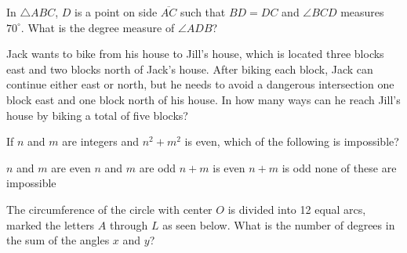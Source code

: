 \documentclass[12pt]{exam}
\begin{document}
\begin{questions}
\question 
In $\bigtriangleup ABC$, $D$ is a point on side $\overline{AC}$ such that $BD=DC$ and $\angle BCD$ measures $70^\circ$. What is the degree measure of $\angle ADB$?

\begin{center}
\end{center}

\begin{oneparchoices}
\end{oneparchoices}
\answerline

\newpage	

\question 
Jack wants to bike from his house to Jill's house, which is located three blocks east and two blocks north of Jack's house. After biking each block, Jack can continue either east or north, but he needs to avoid a dangerous intersection one block east and one block north of his house. In how many ways can he reach Jill's house by biking a total of five blocks?

\begin{oneparchoices}
\end{oneparchoices}
\answerline

\question 
If $n$ and $m$ are integers and $n^2+m^2$ is even, which of the following is impossible?

\begin{oneparchoices}
\choice $n$ and $m$ are even
\choice $n$ and $m$ are odd
\choice $n + m$ is even
\choice $n + m$ is odd
\choice none of these are impossible
\end{oneparchoices}
\answerline

\question 
The circumference of the circle with center $O$ is divided into 12 equal arcs, marked the letters $A$ through $L$ as seen below. What is the number of degrees in the sum of the angles $x$ and $y$?


\end{questions}
\end{document}

